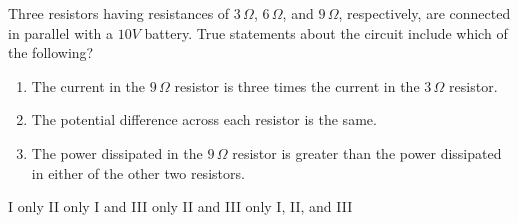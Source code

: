 \begin{questions}\setcounter{question}{15}\question
Three resistors having resistances of $3\,\Omega$, $6\,\Omega$, and $9\,\Omega$, respectively, are connected in parallel with a $10\unit{V}$ battery. True statements about the circuit include which of the following?

\begin{enumerate}
    \item The current in the $9\,\Omega$ resistor is three times the current in the $3\,\Omega$ resistor.
    \item The potential difference across each resistor is the same.
    \item The power dissipated in the $9\,\Omega$ resistor is greater than the power dissipated in either of the other two resistors.
\end{enumerate}

\begin{oneparchoices}
\choice I only
\choice II only
\choice I and III only
\choice II and III only
\choice I, II, and III
\end{oneparchoices}\end{questions}

